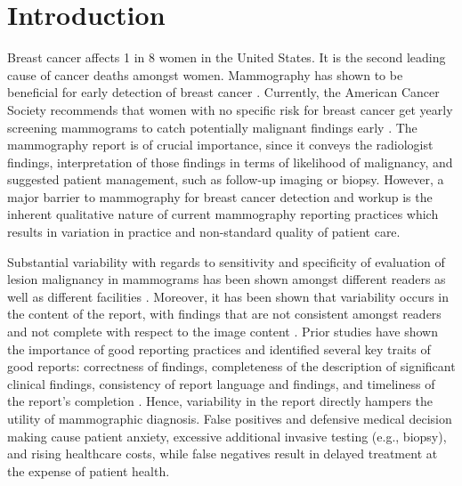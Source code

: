 \chapter{Introduction}
Breast cancer affects 1 in 8 women in the United States. It is the second leading cause of cancer deaths amongst women. Mammography has shown to be beneficial for early detection of breast cancer \cite{Nystrom:2002hb}. Currently, the American Cancer Society recommends that women with no specific risk for breast cancer get yearly screening mammograms to catch potentially malignant findings early \cite{Smith:2003en}. The mammography report is of crucial importance, since it conveys the radiologist findings, interpretation of those findings in terms of likelihood of malignancy, and suggested patient management, such as follow-up imaging or biopsy. However, a major barrier to mammography for breast cancer detection and workup is the inherent qualitative nature of current mammography reporting practices which results in variation in practice and non-standard quality of patient care.
 
Substantial variability with regards to sensitivity and specificity of evaluation of lesion malignancy in mammograms has been shown amongst different readers as well as different facilities \cite{Jackson:2009fw, Beam:1996ui, Elmore:2002vc, Taplin:2008bv}. Moreover, it has been shown that variability occurs in the content of the report, with findings that are not consistent amongst readers and not complete with respect to the image content \cite{Hobby:2000th, Robinson:1997uq}. Prior studies have shown the importance of good reporting practices and identified several key traits of good reports: correctness of findings, completeness of the description of significant clinical findings, consistency of report language and findings, and timeliness of the report’s completion \cite{Johnson:2004kh, HaraldO:2004hi}. Hence, variability in the report directly hampers the utility of mammographic diagnosis. False positives and defensive medical decision making cause patient anxiety, excessive additional invasive testing (e.g., biopsy), and rising healthcare costs, while false negatives result in delayed treatment at the expense of patient health.


